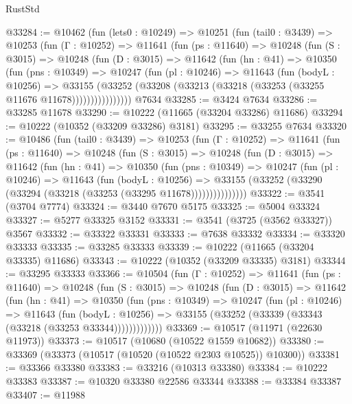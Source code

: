 \begin{lexlean}{RustStd}
\begin{coremodule}
@33284 := @10462
    (fun (lets0 : @10249) =>
    @10251
      (fun (tail0 : @3439) =>
      @10253
        (fun (Γ : @10252) =>
        @11641
          (fun (ps : @11640) =>
          @10248
            (fun (S : @3015) =>
            @10248
              (fun (D : @3015) =>
              @11642
                (fun (hn : @41) =>
                @10350
                  (fun (pns : @10349) =>
                  @10247
                    (fun (pl : @10246) =>
                    @11643
                      (fun (bodyL : @10256) =>
                      @33155
                        (@33252
                          (@33208 (@33213 (@33218 (@33253 (@33255 @11676 @11678))))))))))))))))
    @7634
@33285 := @3424 @7634
@33286 := @33285 @11678
@33290 := @10222 (@11665 (@33204 @33286) @11686)
@33294 := @10222 (@10352 (@33209 @33286) @3181)
@33295 := @33255 @7634
@33320 := @10486
    (fun (tail0 : @3439) =>
    @10253
      (fun (Γ : @10252) =>
      @11641
        (fun (ps : @11640) =>
        @10248
          (fun (S : @3015) =>
          @10248
            (fun (D : @3015) =>
            @11642
              (fun (hn : @41) =>
              @10350
                (fun (pns : @10349) =>
                @10247
                  (fun (pl : @10246) =>
                  @11643
                    (fun (bodyL : @10256) =>
                    @33155 (@33252 (@33290 (@33294 (@33218 (@33253 (@33295 @11678)))))))))))))))
@33322 := @3541 (@3704 @7774)
@33324 := @3440 @7670 @5175
@33325 := @5004 @33324
@33327 := @5277 @33325 @3152
@33331 := @3541 (@3725 (@3562 @33327)) @3567
@33332 := @33322 @33331
@33333 := @7638 @33332
@33334 := @33320 @33333
@33335 := @33285 @33333
@33339 := @10222 (@11665 (@33204 @33335) @11686)
@33343 := @10222 (@10352 (@33209 @33335) @3181)
@33344 := @33295 @33333
@33366 := @10504
    (fun (Γ : @10252) =>
    @11641
      (fun (ps : @11640) =>
      @10248
        (fun (S : @3015) =>
        @10248
          (fun (D : @3015) =>
          @11642
            (fun (hn : @41) =>
            @10350
              (fun (pns : @10349) =>
              @10247
                (fun (pl : @10246) =>
                @11643
                  (fun (bodyL : @10256) =>
                  @33155 (@33252 (@33339 (@33343 (@33218 (@33253 @33344)))))))))))))
@33369 := @10517 (@11971 (@22630 @11973))
@33373 := @10517 (@10680 (@10522 @1559 @10682))
@33380 := @33369 (@33373 (@10517 (@10520 (@10522 @2303 @10525)) @10300))
@33381 := @33366 @33380
@33383 := @33216 (@10313 @33380)
@33384 := @10222 @33383
@33387 := @10320 @33380 @22586 @33344
@33388 := @33384 @33387
@33407 := @11988

\end{coremodule}
\end{lexlean}
